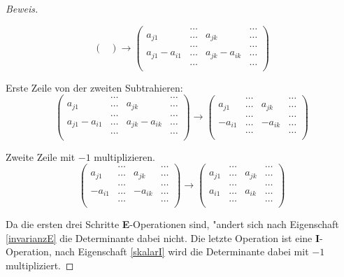 \begin{proof}[Beweis]
\begin{compactenum}
\[\begin{pmatrix}
\end{pmatrix}
\rightarrow
\begin{pmatrix}
             &\dots&             &\dots\\
a_{j1}       &\dots&a_{jk}       &\dots\\
             &\dots&             &\dots\\
a_{j1}-a_{i1}&\dots&a_{jk}-a_{ik}&\dots\\
             &\dots&             &\dots\\
\end{pmatrix}
\]
\item  Erste Zeile von der zweiten Subtrahieren:
\[
\begin{pmatrix}
             &\dots&             &\dots\\
a_{j1}       &\dots&a_{jk}       &\dots\\
             &\dots&             &\dots\\
a_{j1}-a_{i1}&\dots&a_{jk}-a_{ik}&\dots\\
             &\dots&             &\dots\\
\end{pmatrix}
\rightarrow
\begin{pmatrix}
       &\dots&       &\dots\\
a_{j1} &\dots&a_{jk} &\dots\\
       &\dots&       &\dots\\
-a_{i1}&\dots&-a_{ik}&\dots\\
       &\dots&       &\dots\\
\end{pmatrix}
\]
\item Zweite Zeile mit $-1$ multiplizieren.
\[
\begin{pmatrix}
       &\dots&       &\dots\\
a_{j1} &\dots&a_{jk} &\dots\\
       &\dots&       &\dots\\
-a_{i1}&\dots&-a_{ik}&\dots\\
       &\dots&       &\dots\\
\end{pmatrix}
\rightarrow
\begin{pmatrix}
      &\dots&      &\dots\\
a_{j1}&\dots&a_{jk} &\dots\\
      &\dots&      &\dots\\
a_{i1}&\dots&a_{ik}&\dots\\
      &\dots&      &\dots\\
\end{pmatrix}
\]
\end{compactenum}
Da die ersten drei Schritte {\bf E}-Operationen sind, "andert sich nach
Eigenschaft \ref{invarianzE} die Determinante dabei nicht. Die letzte
Operation ist eine {\bf I}-Operation, nach Eigenschaft \ref{skalarI}
wird die Determinante dabei mit $-1$ multipliziert.
\end{proof}

